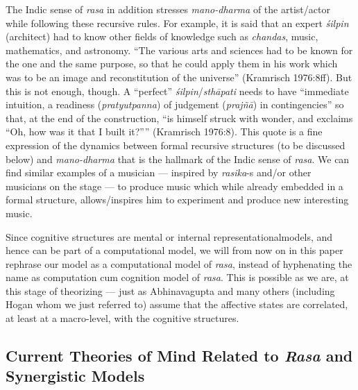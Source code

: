 The Indic sense of \textsl{rasa} in addition stresses \textsl{mano-dharma} of the artist/actor while following these recursive rules. For example, it is said that an expert \textsl{śilpin} (architect) had to know other fields of knowledge such as \textsl{chandas}, music, mathematics, and astronomy. “The various arts and sciences had to be known for the one and the same purpose, so that he could apply them in his work which was to be an image and reconstitution of the universe” (Kramrisch 1976:8ff). But this is not enough, though. A “perfect” \textsl{śilpin}/\textsl{sthāpati} needs to have “immediate intuition, a readiness (\textsl{pratyutpanna}) of judgement (\textsl{prajñā}) in contingencies'' so that, at the end of the construction, ``is himself struck with wonder, and exclaims “Oh, how was it that I built it?”” (Kramrisch 1976:8). This quote is a fine expression of the dynamics between formal recursive structures (to be discussed below) and \textsl{mano-dharma} that is the hallmark of the Indic sense of \textsl{rasa}. We can find similar examples of a musician --- inspired by \textsl{rasika}-s and/or other musicians on the stage --- to produce music which while  already embedded in a formal structure, allows/inspires him to experiment and produce new interesting music.

Since cognitive structures are mental or internal representational\break models, and hence can be part of a computational model, we will from now on in this paper rephrase our model as a computational model of \textsl{rasa}, instead of hyphenating the name as computation cum cognition model of \textsl{rasa}. This is possible as we are, at this stage of theorizing --- just as Abhinavagupta and many others (including Hogan whom we just referred to) assume that the affective states are correlated, at least at a macro-level, with the cognitive structures.\\[-20pt]

\subsection{Current Theories of Mind Related to \textsl{Rasa} and Synergistic Models}\label{chap3-sec3.1}

